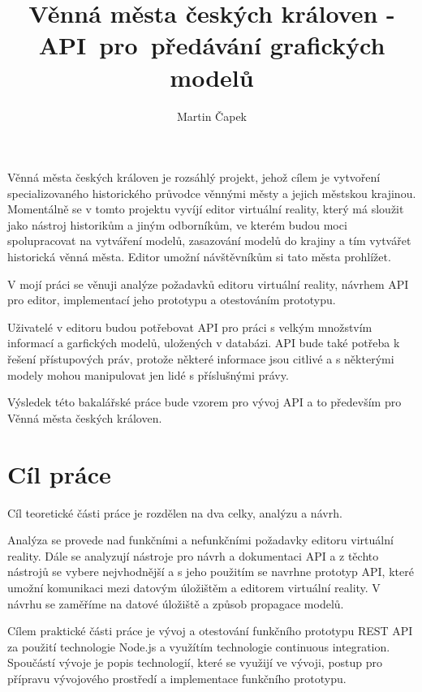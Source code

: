 \documentclass[thesis=B,czech]{FITthesis}[2012/06/26]
\title{Věnná města českých královen - API~pro~předávání grafických modelů}
\author{Martin Čapek} %
\begin{document}

\begin{introduction}
	 Věnná města českých královen je rozsáhlý projekt, jehož cílem je vytvoření specializovaného historického průvodce věnnými městy a jejich městskou krajinou.
	 Momentálně se v tomto projektu vyvíjí editor virtuální reality, který má sloužit jako nástroj historikům a jiným odborníkům, ve kterém budou moci spolupracovat na vytváření modelů, zasazování modelů do krajiny a tím vytvářet historická věnná města. Editor umožní návštěvníkům si tato města prohlížet.

	 V mojí práci se věnuji analýze požadavků editoru virtuální reality, návrhem API pro editor, implementací jeho prototypu a otestováním prototypu.
	 
	 Uživatelé v editoru budou potřebovat API pro práci s velkým množstvím informací a garfických modelů, uložených v databázi. API bude také potřeba k řešení přístupových práv, protože některé informace jsou citlivé a s některými modely mohou manipulovat jen lidé s příslušnými právy. 
	 
	 Výsledek této bakalářské práce bude vzorem pro vývoj API a to především pro Věnná města českých královen.
\end{introduction}

\chapter{Cíl práce}

    Cíl teoretické části práce je rozdělen na dva celky, analýzu a návrh.
	
	Analýza se provede nad funkčními a nefunkčními požadavky editoru virtuální reality. Dále se analyzují nástroje pro návrh a dokumentaci API a z těchto nástrojů se vybere nejvhodnější a s jeho použitím se navrhne prototyp API, které umožní komunikaci mezi datovým úložištěm a editorem virtuální reality. V návrhu se zaměříme na datové úložiště a způsob propagace modelů.

    Cílem praktické části práce je vývoj a otestování funkčního prototypu REST API za použití technologie Node.js a využítím technologie continuous integration.
	Spoučástí vývoje je popis technologií, které se využijí ve vývoji, postup pro přípravu vývojového prostředí a implementace funkčního prototypu.
\end{document}
